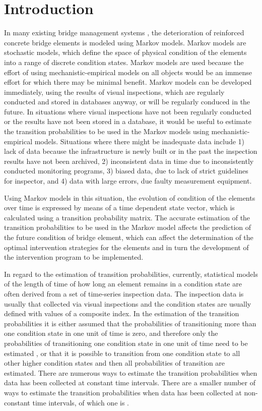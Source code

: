 \documentclass[Journal]{ascelike}
\begin{document}
\section{Introduction}

\label{introduction} 
In many existing bridge management systems , the deterioration of
reinforced concrete bridge elements is modeled using Markov models.
Markov models are stochastic models, which define the space of physical
condition of the elements into a range of discrete condition states.
Markov models are used because the effort of using mechanistic-empirical
models on all objects would be an immense effort for which there may
be minimal benefit. Markov models can be developed immediately, using
the results of visual inspections, which are regularly conducted and
stored in databases anyway, or will be regularly conduced in the future.
In situations where visual inspections have not been regularly conducted
or the results have not been stored in a database, it would be useful
to estimate the transition probabilities to be used in the Markov
models using mechanistic-empirical models. Situations where there
might be inadequate data include 1) lack of data because the infrastructure
is newly built or in the past the inspection results have not been
archived, 2) inconsistent data in time due to inconsistently conducted
monitoring programs, 3) biased data, due to lack of strict guidelines
for inspector, and 4) data with large errors, due faulty measurement
equipment. 

Using Markov models in this situation, the evolution of condition
of the elements over time is expressed by means of a time dependent
state vector, which is calculated using a transition probability matrix.
The accurate estimation of the transition probabilities to be used
in the Markov model affects the prediction of the future condition
of bridge element, which can affect the determination of the optimal
intervention strategies for the elements and in turn the development
of the intervention program to be implemented. 

In regard to the estimation of transition probabilities, currently,
statistical models of the length of time of how long an element remains
in a condition state are often derived from a set of time-series inspection
data. The inspection data is usually that collected via visual inspections
and the condition states are usually defined with values of a composite
index. In the estimation of the transition probabilities it is either
assumed that the probabilities of transitioning more than one condition
state in one unit of time is zero, and therefore only the probabilities
of transitioning one condition state in one unit of time need to be
estimated \cite{Klein1962,Camahan1987}, or that it is possible to
transition from one condition state to all other higher condition
states and then all probabilities of transition are estimated. There
are numerous ways to estimate the transition probabilities when data
has been collected at constant time intervals. There are a smaller
number of ways to estimate the transition probabilities when data
has been collected at non-constant time intervals, of which one is
\cite{Tsuda2006,Kobayashi2012}.
\end{document}

